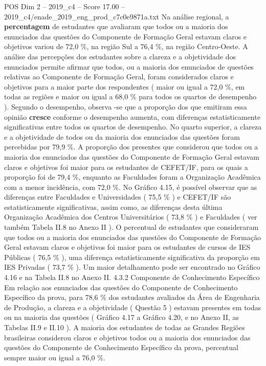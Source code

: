 \begin{textsample}{POS Dim 2 – 2019\_c4 – Score 17.00 – 2019\_c4/enade\_2019\_eng\_prod\_c7c0e9871a.txt}
Na análise regional, a \textbf{percentagem} de estudantes que avaliaram que todos ou a maioria dos enunciados das questões do Componente de Formação Geral estavam claros e objetivos variou de 72,0 \%, na região Sul a 76,4 \%, na região Centro-Oeste.
A análise das percepções dos estudantes sobre a clareza e a objetividade dos enunciados permite afirmar que todos, ou a maioria dos enunciados de questões relativas ao Componente de Formação Geral, foram considerados claros e objetivos para a maior parte dos respondentes ( maior ou igual a 72,0 \%, em todas as regiões e maior ou igual a 68,0 \% para todos os quartos de desempenho ).
Segundo o desempenho, observa -se que a proporção dos que emitiram essa opinião \textbf{cresce} conforme o desempenho aumenta, com diferenças estatisticamente significativas entre todos os quartos de desempenho.
No quarto superior, a clareza e a objetividade de todos ou da maioria dos enunciados das questões foram percebidas por 79,9 \%.
A proporção dos presentes que considerou que todos ou a maioria dos enunciados das questões do Componente de Formação Geral estavam claros e objetivos foi maior para os estudantes de CEFET/IF, para os quais a proporção foi de 79,4 \%, enquanto as Faculdades foram a Organização Acadêmica com a menor incidência, com 72,0 \%.
No Gráfico 4.15, é possível observar que as diferenças entre Faculdades e Universidades ( 75,5 \% ) e CEFET/IF são estatisticamente significativas, assim como, as diferenças desta última Organização Acadêmica dos Centros Universitários ( 73,8 \% ) e Faculdades ( ver também Tabela II.8 no Anexo II ).
O percentual de estudantes que consideraram que todos ou a maioria dos enunciados das questões do Componente de Formação Geral estavam claros e objetivos foi maior para os estudantes de cursos de IES Públicas ( 76,5 \% ), uma diferença estatisticamente significativa da proporção em IES Privadas ( 73,7 \% ).
Um maior detalhamento pode ser encontrado no Gráfico 4.16 e na Tabela II.8 no Anexo II. 4.3.2 Componente de Conhecimento Específico Em relação aos enunciados das questões do Componente de Conhecimento Específico da prova, para 78,6 \% dos estudantes avaliados da Área de Engenharia de Produção, a clareza e a objetividade ( Questão 5 ) estavam presentes em todas ou na maioria das questões ( Gráfico 4.17 a Gráfico 4.20, e no Anexo II, as Tabelas II.9 e II.10 ).
A maioria dos estudantes de todas as Grandes Regiões brasileiras considerou claros e objetivos todos ou a maioria dos enunciados das questões do Componente de Conhecimento Específico da prova, percentual sempre maior ou igual a 76,0 \%.

\end{textsample}
